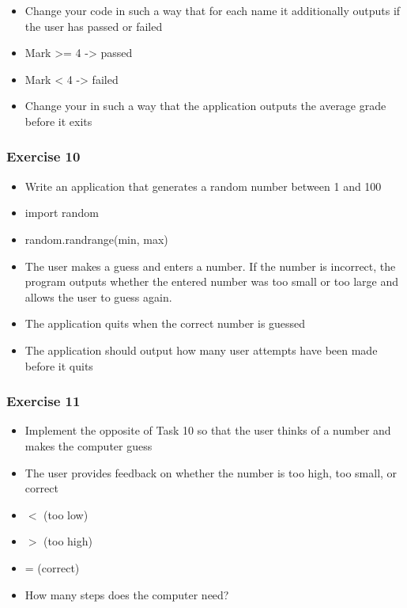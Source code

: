 \documentclass[10pt, a4paper]{beamer} %
\begin{document}
{\begin{frame}
\framebreak

\begin{itemize}
    \item Change your code in such a way that for each name it additionally outputs if the user has passed or failed
    \item Mark >= 4 -> passed
    \item Mark < 4 -> failed
\end{itemize}

\framebreak

\begin{itemize}
    \item Change your in such a way that the application outputs the average grade before it exits
\end{itemize}


\end{frame}

\begin{frame}[c, fragile]\frametitle{Exercise 10}
    
\begin{itemize}
\item  Write an application that generates a random number between 1
and 100
\item  import random
\item  random.randrange(min, max)
\item  The user makes a guess and enters a number. If the number is incorrect, the program outputs whether the entered number was too small or too large and allows the user to guess again.
\item  The application quits when the correct number is guessed
\item  The application should output how many user attempts have been
made before it quits
\end{itemize}

\end{frame}

\begin{frame}[c, fragile]\frametitle{Exercise 11}
    
    \begin{itemize}
        \item Implement the opposite of Task 10 so that the user thinks of a number and makes the computer guess
        \item The user provides feedback on whether the number is too high, too small, or correct
        \item $<$ (too low)
        \item $>$ (too high)
        \item = (correct)
        \item How many steps does the computer need?
    \end{itemize}
\end{frame}


}
\end{document}
